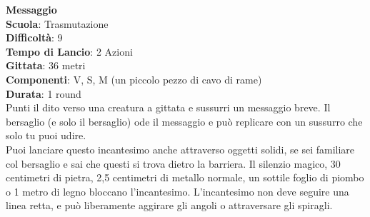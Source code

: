 \begin{multicols}{2}
\medskip\textbf{Messaggio}\\
\textbf{Scuola}: Trasmutazione\\
\textbf{Difficoltà}: 9\\
\textbf{Tempo di Lancio}: 2 Azioni\\
\textbf{Gittata}: 36 metri\\
\textbf{Componenti}: V, S, M (un piccolo pezzo di cavo di rame)\\
\textbf{Durata}: 1 round\\
Punti il dito verso una creatura a gittata e sussurri un messaggio breve. Il bersaglio (e solo il bersaglio) ode il messaggio e può replicare con un sussurro che solo tu puoi udire.\\
Puoi lanciare questo incantesimo anche attraverso oggetti solidi, se sei familiare col bersaglio e sai che questi si trova dietro la barriera. Il silenzio magico, 30 centimetri di pietra, 2,5 centimetri di metallo normale, un sottile foglio di piombo o 1 metro di legno bloccano l'incantesimo. L'incantesimo non deve seguire una linea retta, e può liberamente aggirare gli angoli o attraversare gli spiragli.


\end{multicols}
